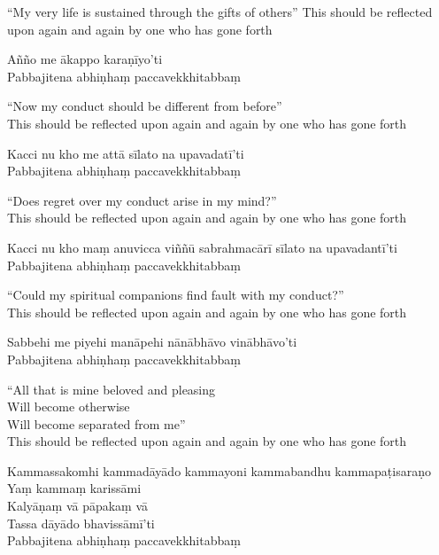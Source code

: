 \begin{english}
“My very life is sustained through the gifts of others”
This should be reflected upon again and again by one who has gone forth
\end{english}

Añño me ākappo karaṇīyo'ti\\
Pabbajitena abhiṇhaṃ paccavekkhitabbaṃ

\begin{english}
“Now my conduct should be different from before”\\
This should be reflected upon again and again by one who has gone forth
\end{english}

Kacci nu kho me attā sīlato na upavadatī'ti\\
Pabbajitena abhiṇhaṃ paccavekkhitabbaṃ

\begin{english}
“Does regret over my conduct arise in my mind?”\\
This should be reflected upon again and again by one who has gone forth
\end{english}

Kacci nu kho maṃ anuvicca viññū sabrahmacārī sīlato na upavadantī'ti\\
Pabbajitena abhiṇhaṃ paccavekkhitabbaṃ

\begin{english}
“Could my spiritual companions find fault with my conduct?”\\
This should be reflected upon again and again by one who has gone forth
\end{english}

Sabbehi me piyehi manāpehi nānābhāvo vinābhāvo'ti\\
Pabbajitena abhiṇhaṃ paccavekkhitabbaṃ

\begin{english}
“All that is mine beloved and pleasing\\
Will become otherwise\\
Will become separated from me”\\
This should be reflected upon again and again by one who has gone forth
\end{english}

Kammassakomhi kammadāyādo kammayoni kammabandhu kammapaṭisaraṇo\\
Yaṃ kammaṃ karissāmi\\
Kalyāṇaṃ vā pāpakaṃ vā\\
Tassa dāyādo bhavissāmī'ti\\
Pabbajitena abhiṇhaṃ paccavekkhitabbaṃ


